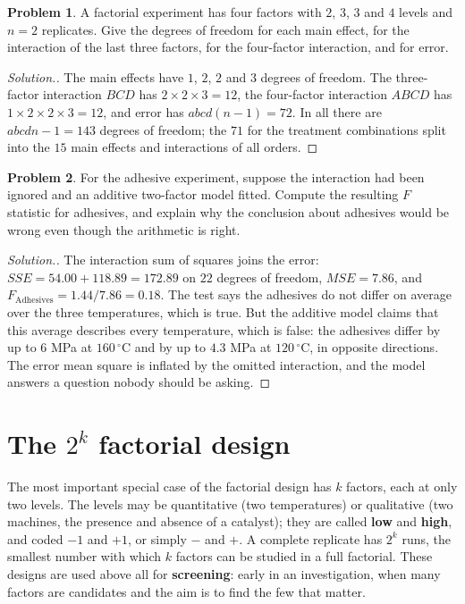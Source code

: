 \documentclass[11pt,a4paper]{article}
\numberwithin{equation}{section}
\theoremstyle{definition}
\newtheorem{problemx}{Problem}[subsection]
\newenvironment{problem}{\begin{problemx}}{\end{problemx}}
\newenvironment{solution}
  {\renewcommand{\qedsymbol}{}\begin{proof}[\textit{Solution}.]}
  {\end{proof}}
\begin{document}
\begin{problem}
A factorial experiment has four factors with $2$, $3$, $3$ and $4$ levels and $n = 2$ replicates. Give the degrees of freedom for each main effect, for the
interaction of the last three factors, for the four-factor interaction, and for error.
\end{problem}

\begin{solution}
The main effects have $1$, $2$, $2$ and $3$ degrees of freedom. The three-factor interaction $BCD$ has $2 \times 2 \times 3 = 12$, the four-factor interaction $ABCD$ has
$1 \times 2 \times 2 \times 3 = 12$, and error has $abcd(n - 1) = 72$. In all there are $abcdn - 1 = 143$ degrees of freedom; the $71$ for the treatment combinations split into the
$15$ main effects and interactions of all orders.
\end{solution}

\begin{problem}
For the adhesive experiment, suppose the interaction had been ignored and an additive two-factor model fitted. Compute the resulting $F$
statistic for adhesives, and explain why the conclusion about adhesives would be wrong even though the arithmetic is right.
\end{problem}

\begin{solution}
The interaction sum of squares joins the error: $SSE = 54.00 + 118.89 = 172.89$ on $22$ degrees of freedom, $MSE = 7.86$, and $F_{\mathrm{Adhesives}} = 1.44/7.86 = 0.18$. The test
says the adhesives do not differ on average over the three temperatures, which is true. But the additive model claims that this average
describes every temperature, which is false: the adhesives differ by up to $6$ MPa at $160\,^\circ$C and by up to $4.3$ MPa at $120\,^\circ$C, in opposite directions. The
error mean square is inflated by the omitted interaction, and the model answers a question nobody should be asking.
\end{solution}

\section{The $2^k$ factorial design}
The most important special case of the factorial design has $k$ factors, each at only two levels. The levels may be quantitative (two
temperatures) or qualitative (two machines, the presence and absence of a catalyst); they are called \textbf{low} and \textbf{high}, and coded $-1$ and
$+1$, or simply $-$ and $+$. A complete replicate has $2^k$ runs, the smallest number with which $k$ factors can be studied in a full factorial. These
designs are used above all for \textbf{screening}: early in an investigation, when many factors are candidates and the aim is to find the few that
matter.
\end{document}
